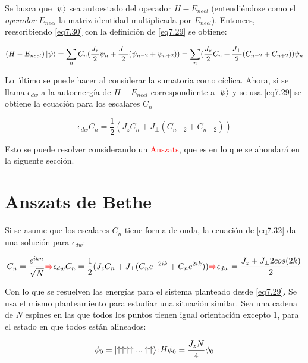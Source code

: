 \documentclass{book}
\begin{document}
Se busca que $\ket{\psi}$ sea autoestado del operador $H-E_{neel}$ (entendiéndose como el \textit{operador} $E_{neel}$ la matriz identidad multiplicada por $E_{neel}$). Entonces, reescribiendo \ref{eq7.30} con la definición de \ref{eq7.29} se obtiene:

\begin{equation}\label{eq7.31}(H-E_{neel})\ket{\psi}=\sum_n C_n(\frac{J_z}{2}\psi_n+\frac{J_\perp}{2}(\psi_{n-2}+\psi_{n+2}))=\sum_n (\frac{J_z}{2} C_n+\frac{J_\perp}{2}(C_{n-2}+C_{n+2})) \psi_n \end{equation}

Lo último se puede hacer al considerar la sumatoria como cíclica. Ahora, si se llama $\epsilon_{dw}$ a la autoenergía de $H-E_{neel}$ correspondiente a $\ket{\psi}$ y se usa \ref{eq7.29} se obtiene la ecuación para los escalares $C_n$

\begin{equation}\label{eq7.32}\epsilon_{dw}C_n=\frac{1}{2}(J_zC_n+J_\perp (C_{n-2}+C_{n+2}))\end{equation}

Esto se puede resolver considerando un \textcolor{red}{Anszats}, que es en lo que se ahondará en la siguente sección.
\section{Anszats de Bethe}

Si se asume que los escalares $C_n$ tiene forma de onda, la ecuación de \ref{eq7.32} da una solución para $\epsilon_{dw}$:

\begin{equation}\label{eq7.33}C_n=\frac{e^{ikn}}{\sqrt{N}}\textcolor{red}{\Rightarrow} \epsilon_{dw}C_n=\frac{1}{2}(J_zC_n+J_\perp (C_{n}e^{-2ik}+C_{n}e^{2ik}))\textcolor{red}{\Rightarrow}\epsilon_{dw}=\frac{J_z+J_\perp 2cos(2k) }{2}\end{equation}

Con lo que se resuelven las energías para el sistema planteado desde \ref{eq7.29}. Se usa el mismo planteamiento para estudiar una situación similar. Sea una cadena de $N$ espines en las que todos los puntos tienen igual orientación excepto 1, para el estado en que todos están alineados:

\begin{equation}\label{eq7.34}\phi_0=\ket{\uparrow\uparrow\uparrow\uparrow...\uparrow\uparrow}\textcolor{red}{:} H\phi_0=\frac{J_zN}{4}\phi_0\end{equation}
\end{document}
